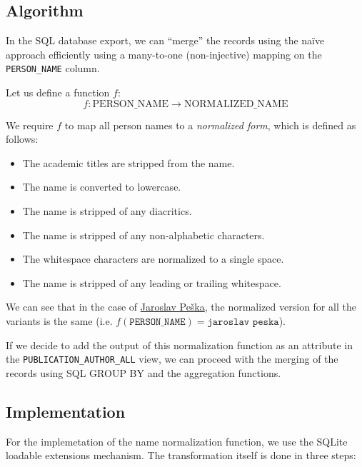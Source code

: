 \subsection{Algorithm}

In the SQL database export, we can ``merge'' the records using the naïve approach efficiently using a many-to-one (non-injective) mapping
on the \texttt{PERSON\_NAME} column.

Let us define a function $f$:
$$f: \text{PERSON\_NAME} \to \text{NORMALIZED\_NAME}$$

We require $f$ to map all person names to a \textit{normalized form}, which is defined as follows:
\begin{itemize}
    \item The academic titles are stripped from the name.
    \item The name is converted to lowercase.
    \item The name is stripped of any diacritics.
    \item The name is stripped of any non-alphabetic characters.
    \item The whitespace characters are normalized to a single space.
    \item The name is stripped of any leading or trailing whitespace.
\end{itemize}

We can see that in the case of \hyperref[fig:jaroslav-peska]{Jaroslav Peška}, 
the normalized version for all the variants is the same (i.e. $f(\texttt{PERSON\_NAME}) = \texttt{jaroslav peska}$).

If we decide to add the output of this normalization function as an attribute in the \texttt{PUBLICATION\_AUTHOR\_ALL} view,
we can proceed with the merging of the records using SQL GROUP BY and the aggregation functions.

\subsection{Implementation}

For the implemetation of the name normalization function, we use the SQLite loadable extensions mechanism.
The transformation itself is done in three steps:

